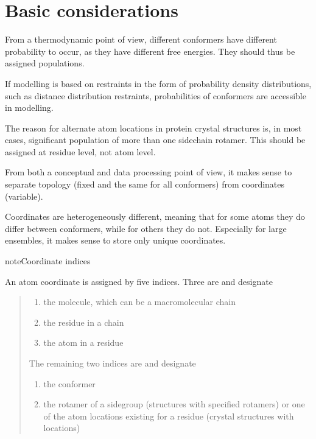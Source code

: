 \documentclass[letterpaper,10pt,english]{sphinxmanual}
\begin{document}
\section{Basic considerations}
\label{\detokenize{MMMx_atomic:basic-considerations}}
From a thermodynamic point of view, different conformers have different probability to occur, as they have different free energies. They should thus be assigned populations.

If modelling is based on restraints in the form of probability density distributions, such as distance distribution restraints, probabilities of conformers are accessible in modelling.

The reason for alternate atom locations in protein crystal structures is, in most cases, significant population of more than one sidechain rotamer.
This should be assigned at residue level, not atom level.

From both a conceptual and data processing point of view, it makes sense to separate topology (fixed and the same for all conformers) from coordinates (variable).

Coordinates are heterogeneously different, meaning that for some atoms they do differ between conformers, while for others they do not.
Especially for large ensembles, it makes sense to store only unique coordinates.

\begin{sphinxadmonition}{note}{Coordinate indices}

An atom coordinate is assigned by five indices. Three are  and designate
\begin{quote}
\begin{enumerate}
%
\item {} 
the molecule, which can be a macromolecular chain

\item {} 
the residue in a chain

\item {} 
the atom in a residue

\end{enumerate}

The remaining two indices are  and designate
\begin{enumerate}
%
\setcounter{enumi}{3}
\item {} 
the conformer

\item {} 
the rotamer of a sidegroup (structures with specified rotamers) or one of the atom locations existing for a residue (crystal structures with locations)

\end{enumerate}
\end{quote}
\end{sphinxadmonition}
\end{document}
